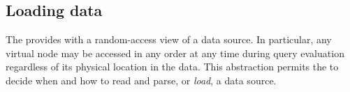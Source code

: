 \subsection{Loading \pads{} data}

The \padx{} \absdm{} provides \Galax{} with a random-access view of a
\pads{} data source. In particular, any virtual node may be accessed
in any order at any time during query evaluation regardless of its
physical location in the \pads{} data.  This abstraction permits the
\padx{} \condm{} to decide when and how to read and parse, or \emph{load},
a data source.  

